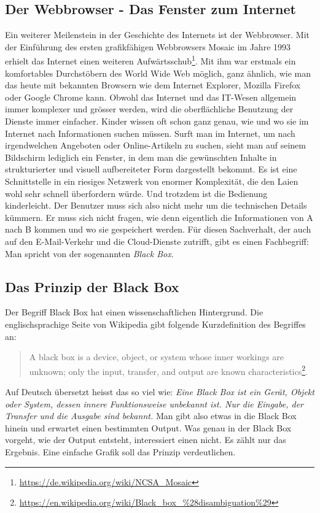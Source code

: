 \subsection{Der Webbrowser - Das Fenster zum Internet}
Ein weiterer Meilenstein in der Geschichte des Internets ist der Webbrowser. Mit der Einführung des ersten grafikfähigen Webbrowsers Mosaic im Jahre 1993 erhielt das Internet einen weiteren Aufwärtsschub\footnote{\url{https://de.wikipedia.org/wiki/NCSA_Mosaic}}.
Mit ihm war erstmals ein komfortables Durchstöbern des World Wide Web möglich, ganz ähnlich, wie man das heute mit bekannten Browsern wie dem Internet Explorer, Mozilla Firefox oder Google Chrome kann. Obwohl das Internet und das IT-Wesen allgemein immer komplexer und grösser werden, wird die oberflächliche Benutzung der Dienste immer einfacher. Kinder wissen oft schon ganz genau, wie und wo sie im Internet nach Informationen suchen müssen. Surft man im Internet, um nach irgendwelchen Angeboten oder Online-Artikeln zu suchen, sieht man auf seinem Bildschirm lediglich ein Fenster, in dem man die gewünschten Inhalte in strukturierter und visuell aufbereiteter Form dargestellt bekommt. Es ist eine Schnittstelle in ein riesiges Netzwerk von enormer Komplexität, die den Laien wohl sehr schnell überfordern würde. Und trotzdem ist die Bedienung kinderleicht. Der Benutzer muss sich also nicht mehr um die technischen Details kümmern. Er muss sich nicht fragen, wie denn eigentlich die Informationen von A nach B kommen und wo sie gespeichert werden. Für diesen Sachverhalt, der auch auf den E-Mail-Verkehr und die Cloud-Dienste zutrifft, gibt es einen Fachbegriff: Man spricht von der sogenannten \textit{Black Box}.

\subsection{Das Prinzip der Black Box}
Der Begriff Black Box hat einen wissenschaftlichen Hintergrund. Die englischsprachige Seite von Wikipedia gibt folgende Kurzdefinition des Begriffes an:

\begin{quote}
A black box is a device, object, or system whose inner workings are unknown; only the input, transfer, and output are known characteristics\footnote{\url{https://en.wikipedia.org/wiki/Black_box_\%28disambiguation\%29}}.
\end{quote}

Auf Deutsch übersetzt heisst das so viel wie: \textit{Eine Black Box ist ein Gerät, Objekt oder System, dessen innere Funktionsweise unbekannt ist. Nur die Eingabe, der Transfer und die Ausgabe sind bekannt.}
Man gibt also etwas in die Black Box hinein und erwartet einen bestimmten Output. Was genau in der Black Box vorgeht, wie der Output entsteht, interessiert einen nicht. Es zählt nur das Ergebnis. Eine einfache Grafik soll das Prinzip verdeutlichen.

